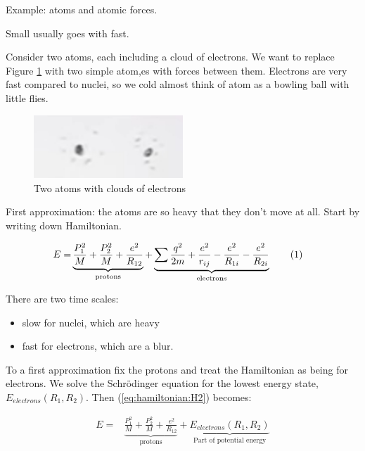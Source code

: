 \documentclass[]{article}
\newcommand\numberthis{\addtocounter{equation}{1}\tag{\theequation}}
\begin{document}
Example: atoms and atomic forces.

Small usually goes with fast.

Consider two atoms, each including a cloud of electrons. We want to replace Figure \ref{fig:3-2-atoms} with two simple atom,es with forces between them. Electrons are very fast compared to nuclei, so we cold almost think of atom as a bowling ball with little flies.

\begin{figure}[H]
	\begin{center}
		\caption{Two atoms with clouds of electrons}\label{fig:3-2-atoms}
		\includegraphics[width=0.5\textwidth]{3-2-atoms}
	\end{center}
\end{figure}

First approximation: the atoms are so heavy that they don't move at all. Start by writing down Hamiltonian.

\begin{align*}
	E=& \underbrace{\frac{P_1^2}{M} + \frac{P_2^2}{M} + \frac{e^2}{R_{12}}}_\text{protons} + \underbrace{\sum \frac{q^2}{2m} + \frac{e^2}{r_{ij}}- \frac{e^2}{R_{1i}} - \frac{e^2}{R_{2i}}}_\text{electrons} \numberthis \label{eq:hamiltonian:H2}
\end{align*}

There are two time scales:
\begin{itemize}
	\item slow for nuclei, which are heavy
	\item fast for electrons, which are a blur.
\end{itemize}

To a first approximation fix the protons and treat the Hamiltonian as being for electrons. We solve the Schr\"odinger equation for the lowest energy state, $E_{electrons}(R_1,R_2)$. Then (\ref{eq:hamiltonian:H2}) becomes:


\begin{align*}
E=& \underbrace{\frac{P_1^2}{M} + \frac{P_2^2}{M} + \frac{e^2}{R_{12}}}_\text{protons} +\underbrace{ E_{electrons}(R_1,R_2)}_\text{Part of potential energy}
\end{align*}
\end{document}
